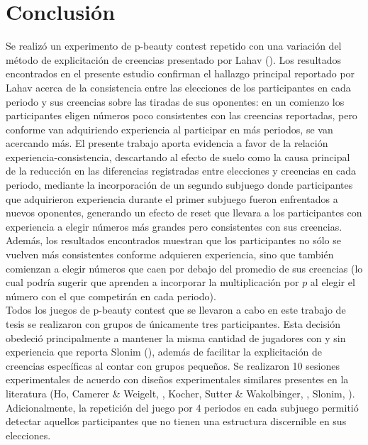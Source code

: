 
\chapter{Conclusión} %

\label{Cap_Conclusion} %

Se realizó un experimento de p-beauty contest repetido con una variación del método de explicitación de creencias presentado por Lahav (\citeyear{Lahav}). Los resultados encontrados en el presente estudio confirman el hallazgo principal reportado por Lahav acerca de la consistencia entre las elecciones de los participantes en cada periodo y sus creencias sobre las tiradas de sus oponentes: en un comienzo los participantes eligen números poco consistentes con las creencias reportadas, pero conforme van adquiriendo experiencia al participar en más periodos, se van acercando más. El presente trabajo aporta evidencia a favor de la relación experiencia-consistencia, descartando al efecto de suelo como la causa principal de la reducción en las diferencias registradas entre elecciones y creencias en cada periodo, mediante la incorporación de un segundo subjuego donde participantes que adquirieron experiencia durante el primer subjuego fueron enfrentados a nuevos oponentes, generando un efecto de reset que llevara a los participantes con experiencia a elegir números más grandes pero consistentes con sus creencias.\\

Además, los resultados encontrados muestran que los participantes no sólo se vuelven más consistentes conforme adquieren experiencia, sino que también comienzan a elegir números que caen por debajo del promedio de sus creencias (lo cual podría sugerir que aprenden a incorporar la multiplicación por $p$ al elegir el número con el que competirán en cada periodo).\\

Todos los juegos de p-beauty contest que se llevaron a cabo en este trabajo de tesis se realizaron con grupos de únicamente tres participantes. Esta decisión obedeció principalmente a mantener la misma cantidad de jugadores con y sin experiencia que reporta Slonim (\citeyear{Slonim}), además de facilitar la explicitación de creencias específicas al contar con grupos pequeños. Se realizaron 10 sesiones experimentales de acuerdo con diseños experimentales similares presentes en la literatura (Ho, Camerer & Weigelt, \citeyear{Ho}, Kocher, Sutter & Wakolbinger, \citeyear{Kocher}, Slonim, \citeyear{Slonim}). Adicionalmente, la repetición del juego por 4 periodos en cada subjuego permitió detectar aquellos participantes que no tienen una estructura discernible en sus elecciones.\\

